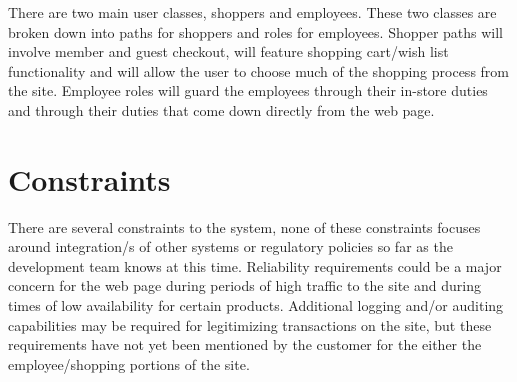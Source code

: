 \documentclass{scrreprt}
\theoremstyle{funreq}
\begin{document}
There are two main user classes, shoppers and employees. These two classes are broken down into paths for shoppers and roles for employees. Shopper paths will involve member and guest checkout, will feature shopping cart/wish list functionality and will allow the user to choose much of the shopping process from the site. Employee roles will guard the employees through their in-store duties and through their duties that come down directly from the web page. %

\section{Constraints}
There are several constraints to the system, none of these constraints focuses around integration/s of other systems or regulatory policies so far as the development team knows at this time. Reliability requirements could be a major concern for the web page during periods of high traffic to the site and during times of low availability for certain products. Additional logging and/or auditing capabilities may be required for legitimizing transactions on the site, but these requirements have not yet been mentioned by the customer for the either the employee/shopping portions of the site. %
\end{document}

